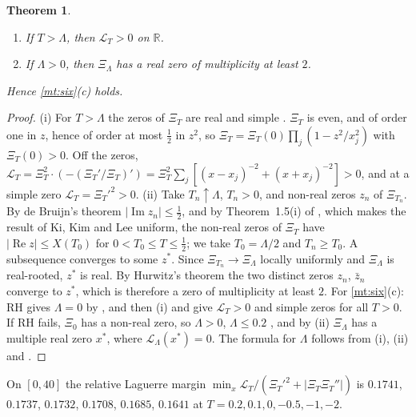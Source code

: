 \documentclass[11pt]{article}
\newtheorem{theorem}{Theorem}[section]
\theoremstyle{definition}\newtheorem{definition}[theorem]{Definition}
\theoremstyle{remark}\newtheorem{remark}[theorem]{Remark}
\newcommand{\R}{\mathbb R}\newcommand{\C}{\mathbb C}\newcommand{\N}{\mathbb N}
\renewcommand{\Re}{\operatorname{Re}}\renewcommand{\Im}{\operatorname{Im}}
\begin{document}
\begin{theorem}\label{thm:h1}
\begin{enumerate}[label=(\roman*)]
\item If $T>\Lambda$, then $\mathcal L_T>0$ on $\R$.
\item If $\Lambda>0$, then $\Xi_\Lambda$ has a real zero of multiplicity at least $2$.
\end{enumerate}
Hence \cref{mt:six}(c) holds.
\end{theorem}
\begin{proof}
(i) For $T>\Lambda$ the zeros of $\Xi_T$ are real and simple \cite[Cor.~1]{CSV}. $\Xi_T$ is even, and of order one in $z$, hence of order at most $\frac12$ in $z^2$, so $\Xi_T=\Xi_T(0)\prod_j(1-z^2/x_j^2)$ with $\Xi_T(0)>0$. Off the zeros, $\mathcal L_T=\Xi_T^2\cdot(-(\Xi_T'/\Xi_T)')=\Xi_T^2\sum_j[(x-x_j)^{-2}+(x+x_j)^{-2}]>0$, and at a simple zero $\mathcal L_T=\Xi_T'^2>0$.
(ii) Take $T_n\uparrow\Lambda$, $T_n>0$, and non-real zeros $z_n$ of $\Xi_{T_n}$. By de Bruijn's theorem $|\Im z_n|\le\frac12$, and by Theorem~1.5(i) of \cite{Polymath}, which makes the result of Ki, Kim and Lee \cite{KKL} uniform, the non-real zeros of $\Xi_T$ have $|\Re z|\le X(T_0)$ for $0<T_0\le T\le\frac12$; we take $T_0=\Lambda/2$ and $T_n\ge T_0$. A subsequence converges to some $z^*$. Since $\Xi_{T_n}\to\Xi_\Lambda$ locally uniformly and $\Xi_\Lambda$ is real-rooted, $z^*$ is real. By Hurwitz's theorem the two distinct zeros $z_n$, $\bar z_n$ converge to $z^*$, which is therefore a zero of multiplicity at least $2$.
For \cref{mt:six}(c): RH gives $\Lambda=0$ by \cite{RT}, and then (i) and \cite[Cor.~1]{CSV} give $\mathcal L_T>0$ and simple zeros for all $T>0$. If RH fails, $\Xi_0$ has a non-real zero, so $\Lambda>0$, $\Lambda\le0.2$ \cite{PT}, and by (ii) $\Xi_\Lambda$ has a multiple real zero $x^*$, where $\mathcal L_\Lambda(x^*)=0$. The formula for $\Lambda$ follows from (i), (ii) and \cite[Cor.~1]{CSV}.
\end{proof}

On $[0,40]$ the relative Laguerre margin $\min_x\mathcal L_T/(\Xi_T'^2+|\Xi_T\Xi_T''|)$ is $0.1741$, $0.1737$, $0.1732$, $0.1708$, $0.1685$, $0.1641$ at $T=0.2,0.1,0,-0.5,-1,-2$.
\end{document}
